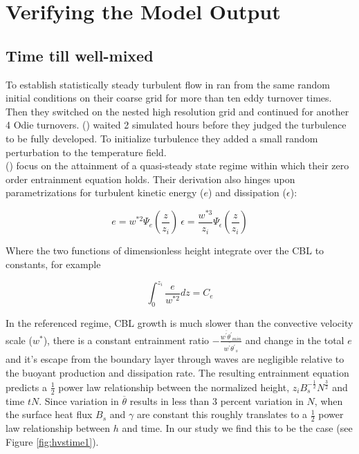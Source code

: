 
\section{Verifying the Model Output}
\label{sec:CheckingtheModel}
\subsection{Time till well-mixed}%
\FloatBarrier

To establish statistically steady turbulent flow \citeauthor{SullMoengStev} in \cite{SullMoengStev}
ran from the same random initial conditions on their coarse grid for more than ten eddy turnover times.
Then they switched on the nested high resolution grid and continued for another 4 Odie turnovers.  
\citeauthor{BrooksFowler2} (\cite{BrooksFowler2}) waited 2 simulated hours before they
judged the turbulence to be fully developed.  To initialize turbulence they added a small random perturbation
to the temperature field.\\ 

\citeauthor{FedConzMir04} (\cite{FedConzMir04}) focus on the attainment of a quasi-steady
state regime within which their zero order entrainment equation holds.  Their derivation also hinges
upon parametrizations for turbulent kinetic energy ($e$) and dissipation ($\epsilon$):

\begin{equation}
e=w^{*2}\Psi_{e}\left( \frac{z}{z_{i}} \right) \ \epsilon=\frac{w^{*3}}{z_{i}}\Psi_{\epsilon}\left( \frac{z}{z_{i}}\right)
\end{equation}

Where the two functions of dimensionless height integrate over the \acs{CBL} to constants, for example

\begin{equation}
\int^{z_{i}}_{0}\frac{e}{w^{*2}}dz = C_{e}
\end{equation}

In the referenced regime, \acs{CBL} growth is much slower than the convective velocity scale ($w^{*}$),
there is a constant entrainment ratio $-\frac{\overline{w^{'}\theta^{'}}_{min}}{\overline{w^{'}\theta^{'}}_{s}}$
and change in the total $e$ and it's escape from the boundary layer through waves are negligible relative
to the buoyant production and dissipation rate.  The resulting entrainment equation predicts a $\frac{1}{2}$
power law relationship between the normalized height, $z_{i}B_{s}^{-\frac{1}{2}} N^{\frac{3}{2}}$ and time
$tN$.  Since variation in $\overline{\theta}$ results in
less than 3 percent variation in $N$, when the surface heat flux $B_{s}$ and $\gamma$ are constant
this roughly translates to a $\frac{1}{2}$ power law relationship between $h$ and time.  In our study we find this to be the case (see Figure \ref{fig:hvstime1}).\\
  
